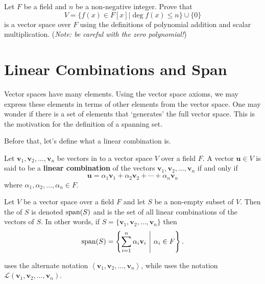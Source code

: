 \begin{exercise}
    Let $F$ be a field and $n$ be a non-negative integer. Prove that
    \[
        V = \{f(x) \in F[x] \vert \deg f(x) \leq n\} \cup \{0\}
    \]
    is a vector space over $F$ using the definitions of polynomial addition and scalar multiplication.\newline
    (\textit{Note: be careful with the zero polynomial!})
\end{exercise}

\section{Linear Combinations and Span}
Vector spaces have many elements. Using the vector space axioms, we may express these elements in terms of other elements from the vector space. One may wonder if there is a set of elements that `generates' the full vector space. This is the motivation for the definition of a spanning set.

Before that, let's define what a linear combination is.
\begin{definition}
    Let $\textbf{v}_1, \textbf{v}_2, \dots, \textbf{v}_n$ be vectors in to a vector space $V$ over a field $F$. A vector $\textbf{u} \in V$ is said to be a \textbf{linear combination} of the vectors $\textbf{v}_1, \textbf{v}_2, \dots, \textbf{v}_n$ if and only if
    \[
        \textbf{u} = \alpha_1\textbf{v}_1 + \alpha_2\textbf{v}_2 + \cdots + \alpha_n \textbf{v}_n
    \]
    where $\alpha_1, \alpha_2, \dots, \alpha_n \in F$.
\end{definition}

\begin{definition}
    Let $V$ be a vector space over a field $F$ and let $S$ be a non-empty subset of $V$. Then the  of $S$ is denoted $\mathrm{span}(S)$ and is the set of all linear combinations of the vectors of $S$. In other words, if $S = \{\textbf{v}_1, \textbf{v}_2, \dots, \textbf{v}_n\}$ then
    \[
        \Span{S} = \left\{\sum_{i=1}^n \alpha_i\textbf{v}_i \vert \alpha_i \in F\right\}.
    \]
\end{definition}
\begin{remark}
    \cite[p.~331]{gallian_2016} uses the alternate notation $\left\langle\textbf{v}_1, \textbf{v}_2, \dots, \textbf{v}_n\right\rangle$, while \cite[p.~31]{treil_2017} uses the notation $\mathcal{L}\left(\textbf{v}_1, \textbf{v}_2, \dots, \textbf{v}_n\right)$.
\end{remark}

